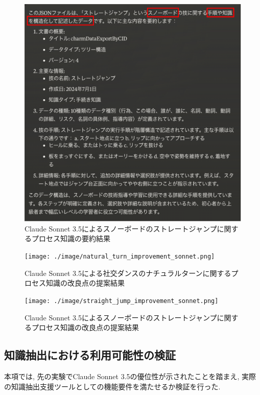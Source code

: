 \begin{figure}[htbp]
    \centering
    \includegraphics[width=1.0\linewidth]{./image/straight_jump_summarize_sonnet.png}
    \caption{Claude Sonnet 3.5によるスノーボードのストレートジャンプに関するプロセス知識の要約結果}
    \label{fig10}
\end{figure}
\begin{figure}[htbp]
    \centering
    \texttt{[image: ./image/natural\_turn\_improvement\_sonnet.png]}
    \caption{Claude Sonnet 3.5による社交ダンスのナチュラルターンに関するプロセス知識の改良点の提案結果}
    \label{fig11}
\end{figure}

\begin{figure}[htbp]
    \centering
    \texttt{[image: ./image/straight\_jump\_improvement\_sonnet.png]}
    \caption{Claude Sonnet 3.5によるスノーボードのストレートジャンプに関するプロセス知識の改良点の提案結果}
    \label{fig12}
\end{figure}


\subsection{知識抽出における利用可能性の検証}
本項では, 先の実験でClaude Sonnet 3.5の優位性が示されたことを踏まえ, 実際の知識抽出支援ツールとしての機能要件を満たせるか検証を行った.


